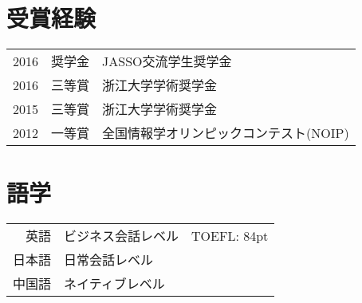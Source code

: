 \documentclass[]{deedy-resume-openfont}
\begin{document}
\begin{minipage}[t]{0.73\textwidth}

\section{受賞経験}

\begin{tabular}{rll}
2016      & 奨学金 & JASSO交流学生奨学金 \\
2016	     & 三等賞  & 浙江大学学術奨学金 \\
2015	     & 三等賞  & 浙江大学学術奨学金 \\
2012	     & 一等賞  & 全国情報学オリンピックコンテスト(NOIP)\\
\end{tabular}



\section{語学} 

\begin{tabular}{rll}

英語   & ビジネス会話レベル & TOEFL: 84pt \\
日本語	     & 日常会話レベル & \\
中国語	     & ネイティブレベル &  \\
\end{tabular}


% 
% 

\end{minipage} 
\end{document}
